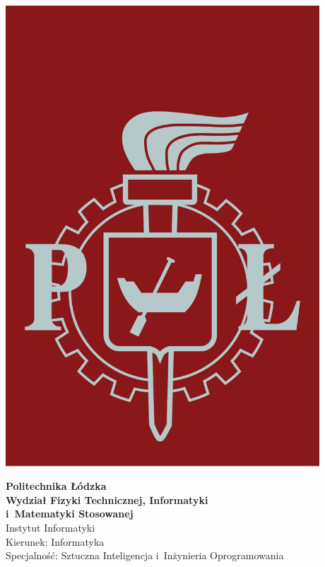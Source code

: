 \begin{titlepage}

\noindent
\begin{minipage}{0.19\textwidth}
\begin{flushleft}
\includegraphics[width=0.88\textwidth]{images/logo}
\end{flushleft}
\end{minipage}
\begin{minipage}[t][][t]{0.81\textwidth}
\begin{flushleft}
\vspace{-3.5\baselineskip}
\textbf{{\large Politechnika Łódzka}\\}
\vspace{\medskipamount}
\textbf{\large Wydział Fizyki Technicznej, Informatyki\\i~Matematyki Stosowanej}
\vspace{\medskipamount}\\
Instytut Informatyki
\\
Kierunek: Informatyka
\\
Specjalność: Sztuczna Inteligencja i~Inżynieria Oprogramowania
\\
\end{flushleft}
\end{minipage}
\vspace{2.5cm}


\end{titlepage}
